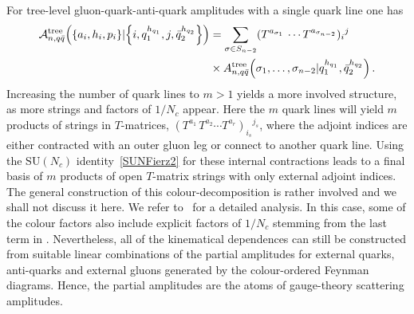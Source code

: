 For tree-level gluon-quark-anti-quark amplitudes with a single quark line one has
\begin{align} \begin{aligned}
\mathcal{A}_{n,q\bar q}^{\text{tree}} \Bigl(\{ a_{i}, h_{i},p_{i}\}|\Bigl\{i,q_{1}^{h_{q_{1}}},
 j,\bar{q}_{2}^{h_{q_{2}}}\Bigr\}\Bigr) & =
 \sum_{\sigma\in S_{n-2}}   
(T^{a_{\sigma_{1}}}\, \cdots T^{a_{\sigma_{n-2}}})_{i}{}^{j}\, \\ 
& \times A_{n,q\bar q}^{\text{tree}}\Bigl(\sigma_{1},
\ldots, {\sigma_{n-2}}| q_{1}^{h_{q_{1}}} , \bar{q}_{2}^{h_{q_{2}}}\Bigr) \, . 
\end{aligned} \end{align}
%
Increasing the number of quark lines to $m>1$ 
yields a more involved structure, as more strings and factors of $1/N_c$ appear. Here the $m$ quark lines will yield $m$ products of strings in $T$-matrices,
$(T^{a_1}\, T^{a_2} \cdots T^{a_r})_{i_s}{}^{{j}_s}$, where the adjoint indices are
either contracted with an outer gluon leg or connect to another quark line. Using the $\text{SU}(N_{c})$ 
identity~\eqref{SUNFierz2} for these internal contractions leads to a final basis of $m$ products
of open $T$-matrix strings with only external adjoint indices. The general construction
of this colour-decomposition is rather involved and we shall not discuss it here. We refer to~\cite{ch1_Mangano:1990by,ch1_Ita:2011ar,ch1_Badger:2012pg,ch1_Reuschle:2013qna} for a detailed
analysis.
In this case, some of the colour factors also include explicit factors of 
$1/N_c$ stemming from the last term in . Nevertheless, all of the
kinematical dependences can still be constructed from
suitable linear combinations of the partial amplitudes for
external quarks, anti-quarks and external gluons generated by the colour-ordered
Feynman diagrams. Hence, the partial amplitudes 
are the atoms of gauge-theory scattering amplitudes.

